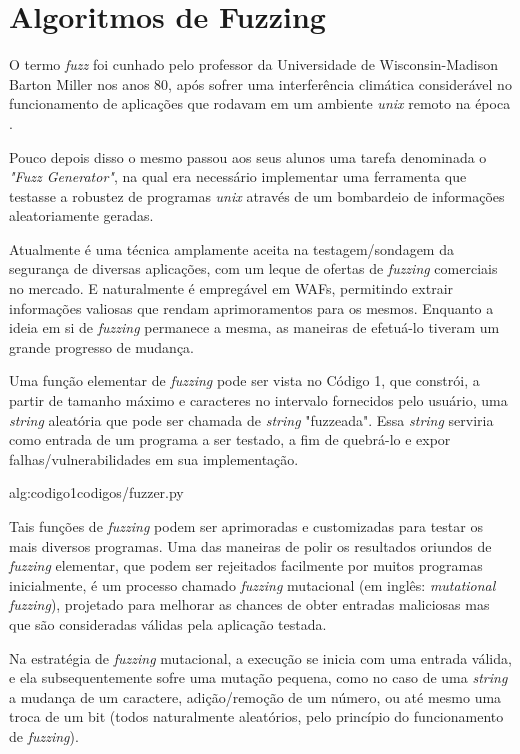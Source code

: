 \section{Algoritmos de Fuzzing}

 O termo \textit{fuzz} foi cunhado pelo professor da Universidade de Wisconsin-Madison Barton Miller nos anos 80, após sofrer uma interferência climática considerável no funcionamento de aplicações que rodavam em um ambiente \textit{unix} remoto na época \cite{fuzzing_info}. 

Pouco depois disso o mesmo passou aos seus alunos uma tarefa denominada o \textit{"Fuzz Generator"}, na qual era necessário implementar uma ferramenta que testasse a robustez de programas \textit{unix} através de um bombardeio de informações aleatoriamente geradas.

Atualmente é uma técnica amplamente aceita na testagem/sondagem da segurança de diversas aplicações, com um leque de ofertas de \textit{fuzzing} comerciais no mercado. E naturalmente é empregável em WAFs, permitindo extrair informações valiosas que rendam aprimoramentos para os mesmos. Enquanto a ideia em si de \textit{fuzzing} permanece a mesma, as maneiras de efetuá-lo tiveram um grande progresso de mudança.


Uma função elementar de \textit{fuzzing} pode ser vista no Código 1, que constrói, a partir de tamanho máximo e caracteres no intervalo fornecidos pelo usuário, uma \textit{string} aleatória que pode ser chamada de \textit{string} "fuzzeada". Essa \textit{string} serviria como entrada de um programa a ser testado, a fim de quebrá-lo e expor falhas/vulnerabilidades em sua implementação.

 {alg:codigo1}{codigos/fuzzer.py}

\bigskip
Tais funções de \textit{fuzzing} podem ser aprimoradas e customizadas para testar os mais diversos programas. Uma das maneiras de polir os resultados oriundos de \textit{fuzzing} elementar, que podem ser rejeitados facilmente por muitos programas inicialmente, é um processo chamado \textit{fuzzing} mutacional (em inglês: \textit{mutational fuzzing}), projetado para melhorar as chances de obter entradas maliciosas mas que são consideradas válidas pela aplicação testada.

Na estratégia de \textit{fuzzing} mutacional, a execução se inicia com uma entrada válida, e ela subsequentemente sofre uma mutação pequena, como no caso de uma \textit{string} a mudança de um caractere, adição/remoção de um número, ou até mesmo uma troca de um bit (todos naturalmente aleatórios, pelo princípio do funcionamento de \textit{fuzzing}).

